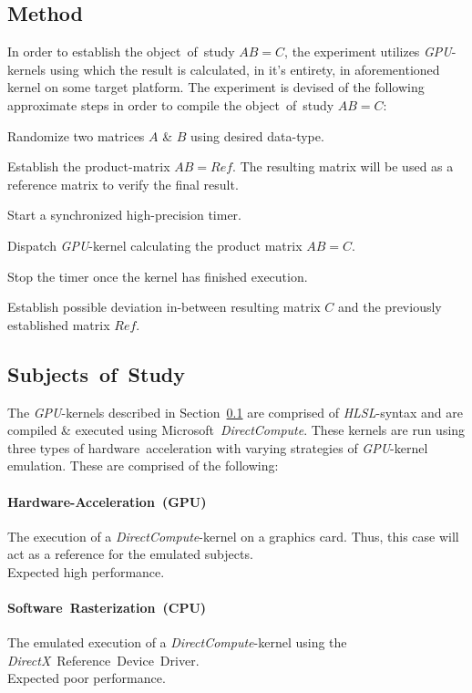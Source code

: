 \documentclass[fleqn,10pt]{SelfArx} %
\begin{document}
\subsection{Method}
\label{sec:contribution:method}
In order to establish the object~of~study $AB=C$, the experiment utilizes \textit{GPU}-kernels using which the result is calculated, in it’s entirety, in aforementioned kernel on some target platform. The experiment is devised of the following approximate steps in order to compile the object~of~study $AB=C$:
\begin{enumerate*}
	\item Randomize two matrices $A$ \& $B$ using desired data-type.
	\item Establish the product-matrix $AB=Ref$. The resulting matrix will be used as a reference matrix to verify the final result.
	\item Start a synchronized high-precision timer.
	\item Dispatch \textit{GPU}-kernel calculating the product matrix $AB=C$.
	\item Stop the timer once the kernel has finished execution.
	\item Establish possible deviation in-between resulting matrix $C$ and the previously established matrix $Ref$.
\end{enumerate*}

\subsection{Subjects~of~Study}
\label{sec:contribution:subjectofstudy}
The \textit{GPU}-kernels described in Section~\ref{sec:contribution:method} are comprised of \textit{HLSL}-syntax and are compiled \& executed using Microsoft~\textit{DirectCompute}. These kernels are run using three types of hardware~acceleration with varying strategies of \textit{GPU}-kernel emulation. These are comprised of the following:
\paragraph{Hardware-Acceleration~(GPU)}
	The execution of a \textit{DirectCompute}-kernel on a graphics card. Thus, this case will act as a reference for the emulated subjects.\\
	Expected high performance.
\paragraph{Software~Rasterization~(CPU)}
	The emulated execution of a \textit{DirectCompute}-kernel using the \textit{DirectX}~Reference~Device~Driver.\\
	Expected poor performance.
\end{document}
